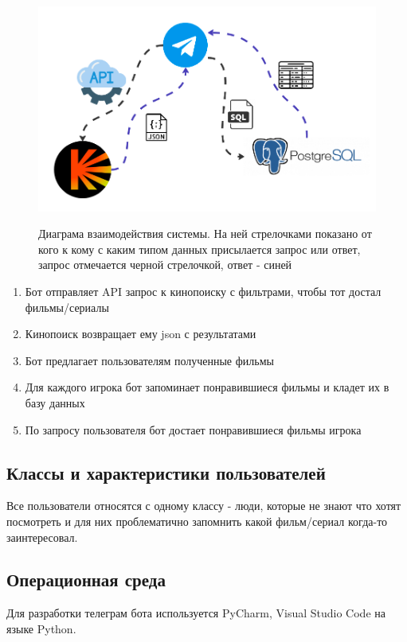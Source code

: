 \documentclass{article}
\begin{document}
\begin{figure}[htbp]
  \centering
      \centering
      \includegraphics[width=1\textwidth]{project_structure.png}
      \label{fig:project diogram}
      \caption{Диаграма взаимодействия системы. На ней стрелочками показано от кого к кому с каким типом данных присылается запрос или ответ, запрос отмечается черной стрелочкой, ответ - синей}
  \label{fig:project structure}
\end{figure}



\begin{enumerate}
    \item Бот отправляет API запрос к кинопоиску с фильтрами, чтобы тот достал фильмы/сериалы
    \item Кинопоиск возвращает ему json с результатами
    \item Бот предлагает пользователям полученные фильмы
    \item Для каждого игрока бот запоминает понравившиеся фильмы и кладет их в базу данных
    \item По запросу пользователя бот достает понравившиеся фильмы игрока
\end{enumerate}

\subsection{Классы и характеристики пользователей}

Все пользователи относятся с одному классу - люди, которые не знают что хотят посмотреть и для них проблематично запомнить какой фильм/сериал когда-то заинтересовал.

\subsection{Операционная среда}
Для разработки телеграм бота используется PyCharm, Visual Studio Code на языке Python.
\end{document}
